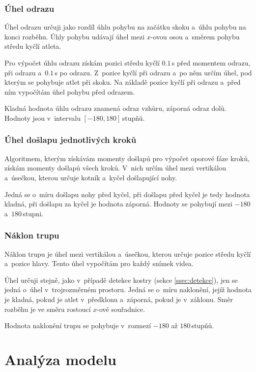 \subsubsection{Úhel odrazu}

Úhel odrazu určuji jako rozdíl úhlu pohybu na začátku skoku a~úhlu pohybu na konci rozběhu. Úhly pohybu udávají úhel mezi $x$-ovou osou a~směrem pohybu středu kyčlí atleta.

Pro výpočet úhlu odrazu získám pozici středu kyčlí $0.1$\,\rm s před momentem odrazu, při odrazu a~$0.1$\,\rm s po odrazu. Z~pozice kyčlí při odrazu a~po něm určím úhel, pod kterým se pohybuje atlet při skoku. Na základě pozice kyčlí při odrazu a~před ním vypočítám úhel pohybu před odrazem.

Kladná hodnota úhlu odrazu znamená odraz vzhůru, záporná odraz dolů. Hodnoty jsou v~intervalu $[-180,180]$\,\rm stupňů.


\subsubsection{Úhel došlapu jednotlivých kroků}

Algoritmem, kterým získávám momenty došlapů pro výpočet oporové fáze kroků, získám momenty došlapů všech kroků. V~nich určím úhel mezi vertikálou a~úsečkou, kterou určuje kotník a~kyčel došlapující nohy.

Jedná se o~míru došlapu nohy před kyčel, při došlapu před kyčel je tedy hodnota kladná, při došlapu za kyčel je hodnota záporná. Hodnoty se pohybují mezi $-180$ a~$180$\,\rm stupni.


\subsubsection{Náklon trupu}

Náklon trupu je úhel mezi vertikálou a~úsečkou, kterou určuje pozice středu kyčlí a~pozice hlavy. Tento úhel vypočítám pro každý snímek videa.

Úhel určuji stejně, jako v~případě detekce kostry (sekce \ref{ssec:detekce}), jen se jedná o~úhel v~trojrozměrném prostoru. Jedná se o~míru naklonění, jejíž hodnota je kladná, pokud je atlet v~předklonu a~záporná, pokud je v~záklonu. Směr rozběhu je ve směru rostoucí $x$-ové souřadnice.

Hodnota naklonění trupu se pohybuje v~rozmezí $-180$ až $180$\,\rm stupňů.



\section{Analýza modelu}


